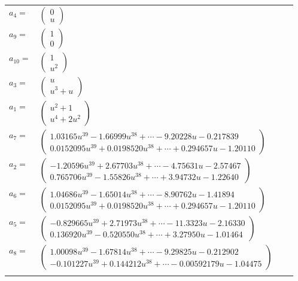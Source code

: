 \documentclass[1p]{elsarticle_modified}
\theoremstyle{definition}
\begin{document}
\begin{tabular}{m{7pt} m{180pt} m{7pt} m{180pt} }
\flushright $a_{4}=$&$\begin{pmatrix}0\\u\end{pmatrix}$ \\
\flushright $a_{9}=$&$\begin{pmatrix}1\\0\end{pmatrix}$ \\
\flushright $a_{10}=$&$\begin{pmatrix}1\\u^2\end{pmatrix}$ \\
\flushright $a_{3}=$&$\begin{pmatrix}u\\u^3+u\end{pmatrix}$ \\
\flushright $a_{1}=$&$\begin{pmatrix}u^2+1\\u^4+2 u^2\end{pmatrix}$ \\
\flushright $a_{7}=$&$\begin{pmatrix}1.03165 u^{39}-1.66999 u^{38}+\cdots-9.20228 u-0.217839\\0.0152095 u^{39}+0.0198520 u^{38}+\cdots+0.294657 u-1.20110\end{pmatrix}$ \\
\flushright $a_{2}=$&$\begin{pmatrix}-1.20596 u^{39}+2.67703 u^{38}+\cdots-4.75631 u-2.57467\\0.765706 u^{39}-1.55826 u^{38}+\cdots+3.94732 u-1.22640\end{pmatrix}$ \\
\flushright $a_{6}=$&$\begin{pmatrix}1.04686 u^{39}-1.65014 u^{38}+\cdots-8.90762 u-1.41894\\0.0152095 u^{39}+0.0198520 u^{38}+\cdots+0.294657 u-1.20110\end{pmatrix}$ \\
\flushright $a_{5}=$&$\begin{pmatrix}-0.829665 u^{39}+2.71973 u^{38}+\cdots-11.3323 u-2.16330\\0.136920 u^{39}-0.520550 u^{38}+\cdots+3.27950 u-1.01464\end{pmatrix}$ \\
\flushright $a_{8}=$&$\begin{pmatrix}1.00098 u^{39}-1.67814 u^{38}+\cdots-9.29825 u-0.212902\\-0.101227 u^{39}+0.144212 u^{38}+\cdots-0.00592179 u-1.04475\end{pmatrix}$\\&\end{tabular}
\end{document}
